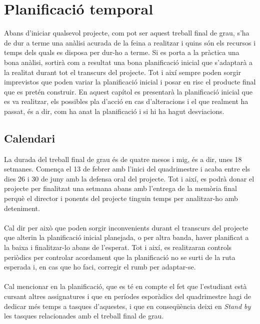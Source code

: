 
\chapter{Planificació temporal} %

\label{Chapter9} %

Abans d'iniciar qualsevol projecte, com pot ser aquest treball final de grau, s'ha de dur a terme una anàlisi acurada de la feina a realitzar i quins són els recursos i temps dels quals es disposa per dur-ho a terme. Si es porta a la pràctica una bona anàlisi, sortirà com a resultat una bona planificació inicial que s'adaptarà a la realitat durant tot el transcurs del projecte. Tot i així sempre poden sorgir imprevistos que poden variar la planificació inicial i posar en risc el producte final que es pretén construir. En aquest capítol es presentarà la planificació inicial que es va realitzar, els possibles pla d'acció en cas d'alteracions i el que realment ha passat, és a dir, com ha anat la planificació i si hi ha hagut desviacions.


\section{Calendari}

La durada del treball final de grau és de quatre mesos i mig, és a dir, unes 18 setmanes. Comença el 13 de febrer amb l'inici del quadrimestre i acaba entre els dies 26 i 30 de juny amb la defensa oral del projecte. Tot i així, es podrà donar el projecte per finalitzat una setmana abans amb l'entrega de la memòria final perquè el director i ponents del projecte tinguin temps per analitzar-ho amb deteniment.
\\\\
Cal dir per això que poden sorgir inconvenients durant el transcurs del projecte que alterin la planificació inicial planejada, o per altra banda, haver planificat a la baixa i finalitzar-lo abans de l'esperat. Tot i així, es realitzaran controls periòdics per controlar acordament que la planificació no se surti de la ruta esperada i, en cas que ho faci, corregir el rumb per adaptar-se.
\\\\
Cal mencionar en la planificació, que es té en compte el fet que l'estudiant està cursant altres assignatures i que en períodes esporàdics del quadrimestre hagi de dedicar més temps a tasques d'aquestes, i que en conseqüència deixi en \textit{Stand by} les tasques relacionades amb el treball final de grau.

